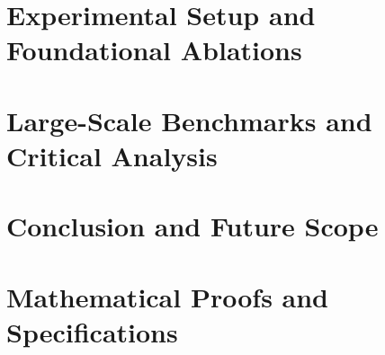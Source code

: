 \documentclass[a4paper, 12pt]{report}
\theoremstyle{definition}
\begin{document}
\chapter{Experimental Setup and Foundational Ablations}
 

\chapter{Large-Scale Benchmarks and Critical Analysis}


\chapter{Conclusion and Future Scope}


\appendix
\chapter{Mathematical Proofs and Specifications}


\newpage
\renewcommand{\bibname}{References}

\begingroup
\singlespacing

\endgroup
\end{document}
